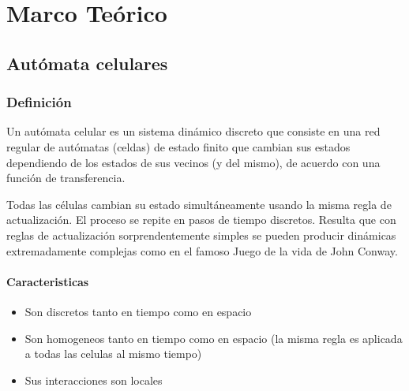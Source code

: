 \documentclass[12pt, fleqn]{report}                             %
\theoremstyle{break}                                            %
\begin{document}
\restoregeometry                                                    %
\nopagecolor                                                        %




\tableofcontents{}
\label{sec:Index}

\clearpage


\part{Marco Teórico}
\clearpage

    \chapter{Autómata celulares}

        \clearpage
        \section{Definición}

        Un autómata celular es un sistema dinámico discreto que consiste en una red regular
        de autómatas (celdas) de estado finito que cambian sus estados dependiendo de los estados de sus
        vecinos (y del mismo), de acuerdo con una función de transferencia. 
        
        Todas las células cambian su estado simultáneamente usando la misma regla de actualización. 
        El proceso se repite en pasos de tiempo discretos. 
        Resulta que con reglas de actualización sorprendentemente simples se pueden producir 
        dinámicas extremadamente complejas como en el famoso Juego de la vida de John Conway.  \cite{Kari}
        
      \subsection{Caracteristicas}
      \begin{itemize}
        \item Son discretos tanto en tiempo como en espacio
        \item Son homogeneos tanto en tiempo como en espacio 
        (la misma regla es aplicada a todas las celulas al mismo tiempo)
        \item Sus interacciones son locales
      \end{itemize}
\end{document}
